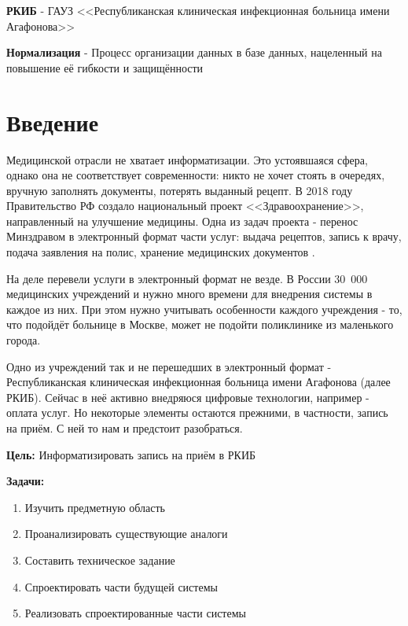 \documentclass[a4paper,article]{article}
\begin{document}
    \textbf{РКИБ} - ГАУЗ <<Республиканская клиническая инфекционная больница имени Агафонова>>

    \textbf{Нормализация} - Процесс организации данных в базе данных, нацеленный на повышение её гибкости и защищённости

    \newpage

    \section*{Введение}

        Медицинской отрасли не хватает информатизации. Это устоявшаяся сфера, однако она не соответствует современности: никто не хочет стоять в очередях, вручную заполнять документы, потерять выданный рецепт. В 2018 году Правительство РФ создало национальный проект <<Здравоохранение>>, направленный на улучшение медицины. Одна из задач проекта - перенос Минздравом в электронный формат части услуг: выдача рецептов, запись к врачу, подача заявления на полис, хранение медицинских документов \cite{natsproektzdravoohranenie}.

        На деле перевели услуги в электронный формат не везде. В России 30~000 медицинских учреждений и нужно много времени для внедрения системы в каждое из них. При этом нужно учитывать особенности каждого учреждения - то, что подойдёт больнице в Москве, может не подойти поликлинике из маленького города.

        Одно из учреждений так и не перешедших в электронный формат - Республиканская клиническая инфекционная больница имени Агафонова (далее РКИБ). Сейчас в неё активно внедряюся цифровые технологии, например - оплата услуг. Но некоторые элементы остаются прежними, в частности, запись на приём. С ней то нам и предстоит разобраться.

        \textbf{Цель:} Информатизировать запись на приём в РКИБ

        \textbf{Задачи:}

        \begin{enumerate}[nolistsep]
            \item Изучить предметную область
            \item Проанализировать существующие аналоги
            \item Составить техническое задание
            \item Спроектировать части будущей системы
            \item Реализовать спроектированные части системы
        \end{enumerate}
\end{document}
